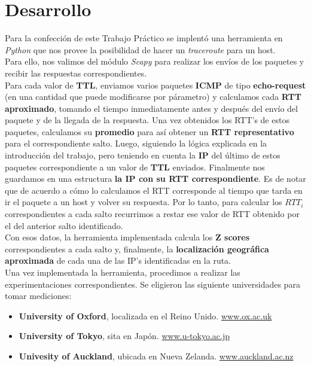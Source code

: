 \section{Desarrollo}

\indent \indent Para la confección de este Trabajo Práctico se implentó una herramienta en \textit{Python} que nos provee la posibilidad de hacer un \textit{traceroute} para un host. \\
\indent Para ello, nos valimos del módulo \textit{Scapy} para realizar los envíos de los paquetes y recibir las respuestas correspondientes.\\
\indent Para cada valor de \textbf{TTL}, enviamos varios paquetes \textbf{ICMP} de tipo \textbf{echo-request} (en una cantidad que puede modificarse por párametro) y calculamos cada \textbf{RTT aproximado}, tomando el tiempo inmediatamente antes y después del envío del paquete y de la llegada de la respuesta. Una vez obtenidos los RTT's de estos paquetes, calculamos su \textbf{promedio} para así obtener un \textbf{RTT representativo} para el correspondiente salto. Luego, siguiendo la lógica explicada en la introducción del trabajo, pero teniendo en cuenta la \textbf{IP} del último de estos paquetes correspondiente a un valor de \textbf{TTL} enviados. Finalmente nos guardamos en una estructura \textbf{la IP con su RTT correspondiente}. Es de notar que de acuerdo a cómo lo calculamos el RTT corresponde al tiempo que tarda en ir el paquete a un host y volver su respuesta. Por lo tanto, para calcular los $RTT_i$ correspondientes a cada salto recurrimos a restar ese valor de RTT obtenido por el del anterior salto identificado.\\
\indent Con esos datos, la herramienta implementada calcula los \textbf{Z scores} correspondientes a cada salto y, finalmente, la \textbf{localización geográfica aproximada} de cada una de las IP's identificadas en la ruta.\\
\indent Una vez implementada la herramienta, procedimos a realizar las experimentaciones correspondientes. Se eligieron las siguiente universidades para tomar mediciones:\\
\begin{itemize}
\item \textbf{University of Oxford}, localizada en el Reino Unido. \url{www.ox.ac.uk}
\item \textbf{University of Tokyo}, sita en Japón. \url{www.u-tokyo.ac.jp}
\item \textbf{Univesity of Auckland}, ubicada en Nueva Zelanda. \url{www.auckland.ac.nz}
\end{itemize}

